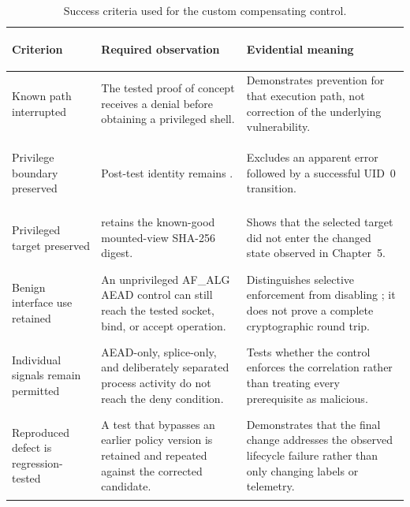 \begin{table}[H]
    \centering
    \caption{Success criteria used for the custom compensating control.}
    \label{tab:mori-success-criteria}
    \small
    \begin{tabularx}{\textwidth}{@{}>{\bfseries\raggedright\arraybackslash}p{}>{\raggedright\arraybackslash}p{}Y@{}}
        \toprule
        Criterion & Required observation & Evidential meaning \\
        \midrule
        Known path interrupted &
        The tested proof of concept receives a denial before obtaining a
        privileged shell. &
        Demonstrates prevention for that execution path, not correction of the
        underlying vulnerability. \\

        Privilege boundary preserved &
        Post-test identity remains . &
        Excludes an apparent error followed by a successful UID~0 transition. \\

        Privileged target preserved &
         retains the known-good mounted-view SHA-256 digest. &
        Shows that the selected target did not enter the changed state observed
        in Chapter~5. \\

        Benign interface use retained &
        An unprivileged AF\_ALG AEAD control can still reach the tested
        socket, bind, or accept operation. &
        Distinguishes selective enforcement from disabling
        ; it does not prove a complete cryptographic
        round trip. \\

        Individual signals remain permitted &
        AEAD-only, splice-only, and deliberately separated process activity do
        not reach the deny condition. &
        Tests whether the control enforces the correlation rather than treating
        every prerequisite as malicious. \\

        Reproduced defect is regression-tested &
        A test that bypasses an earlier policy version is retained and repeated
        against the corrected candidate. &
        Demonstrates that the final change addresses the observed lifecycle
        failure rather than only changing labels or telemetry. \\
        \bottomrule
    \end{tabularx}
\end{table}


